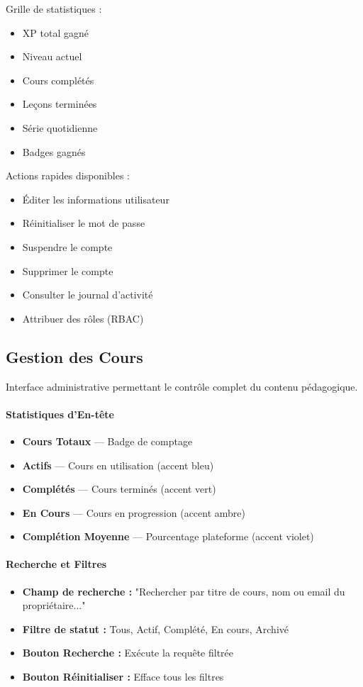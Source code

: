 \documentclass[12pt, a4paper]{report}
\begin{document}
Grille de statistiques :
\begin{itemize}
    \item XP total gagné
    \item Niveau actuel
    \item Cours complétés
    \item Leçons terminées
    \item Série quotidienne
    \item Badges gagnés
\end{itemize}

Actions rapides disponibles :
\begin{itemize}
    \item Éditer les informations utilisateur
    \item Réinitialiser le mot de passe
    \item Suspendre le compte
    \item Supprimer le compte
    \item Consulter le journal d'activité
    \item Attribuer des rôles (RBAC)
\end{itemize}

\subsection{Gestion des Cours}

Interface administrative permettant le contrôle complet du contenu pédagogique.

\paragraph{Statistiques d'En-tête}
\begin{itemize}
    \item \textbf{Cours Totaux} --- Badge de comptage
    \item \textbf{Actifs} --- Cours en utilisation (accent bleu)
    \item \textbf{Complétés} --- Cours terminés (accent vert)
    \item \textbf{En Cours} --- Cours en progression (accent ambre)
    \item \textbf{Complétion Moyenne} --- Pourcentage plateforme (accent violet)
\end{itemize}

\paragraph{Recherche et Filtres}
\begin{itemize}
    \item \textbf{Champ de recherche :} "Rechercher par titre de cours, nom ou email du propriétaire..."
    \item \textbf{Filtre de statut :} Tous, Actif, Complété, En cours, Archivé
    \item \textbf{Bouton Recherche :} Exécute la requête filtrée
    \item \textbf{Bouton Réinitialiser :} Efface tous les filtres
\end{itemize}
\end{document}
